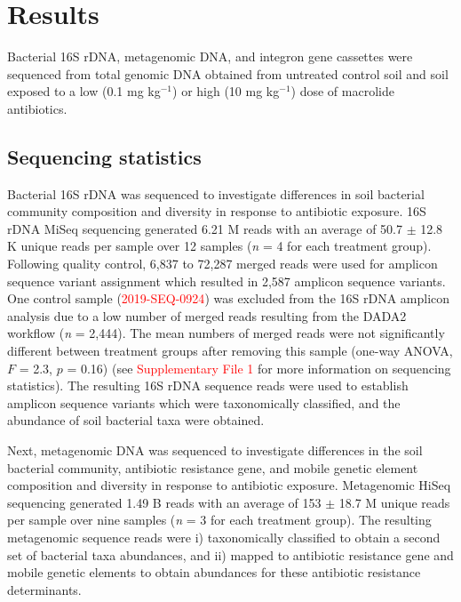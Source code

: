\chapter{Results}

Bacterial 16S rDNA, metagenomic DNA, and integron gene cassettes were sequenced from total genomic DNA obtained from untreated control soil and soil exposed to a low (0.1 mg kg$^{-1}$) or high (10 mg kg$^{-1}$) dose of macrolide antibiotics.

\section{Sequencing statistics}

Bacterial 16S rDNA was sequenced to investigate differences in soil bacterial community composition and diversity in response to antibiotic exposure.
16S rDNA MiSeq sequencing generated 6.21 M reads with an average of 50.7 $\pm$ 12.8 K unique reads per sample over 12 samples  (\textit{n} = 4 for each treatment group).
Following quality control, 6,837 to 72,287 merged reads were used for amplicon sequence variant assignment which resulted in 2,587 amplicon sequence variants.
One control sample (\textcolor{red}{2019-SEQ-0924}) was excluded from the 16S rDNA amplicon analysis due to a low number of merged reads resulting from the DADA2 workflow  (\textit{n} = 2,444).
The mean numbers of merged reads were not significantly different between treatment groups after removing this sample (one-way ANOVA, $F$ = 2.3, $p$ = 0.16) (see \textcolor{red}{Supplementary File 1} for more information on sequencing statistics).
The resulting 16S rDNA sequence reads were used to establish amplicon sequence variants which were taxonomically classified, and the abundance of soil bacterial taxa were obtained.

Next, metagenomic DNA was sequenced to investigate differences in the soil bacterial community, antibiotic resistance gene, and mobile genetic element composition and diversity in response to antibiotic exposure.
Metagenomic HiSeq sequencing generated 1.49 B reads with an average of 153 $\pm$ 18.7 M unique reads per sample over nine samples (\textit{n} = 3 for each treatment group).
The resulting metagenomic sequence reads were i) taxonomically classified to obtain a second set of bacterial taxa abundances, and ii) mapped to antibiotic resistance gene and mobile genetic elements to obtain abundances for these antibiotic resistance determinants.

